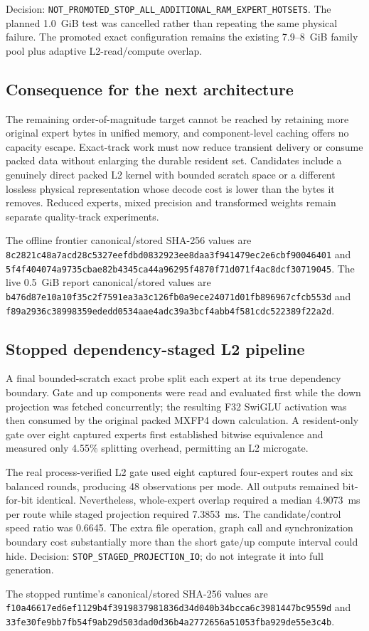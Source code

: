 Decision:
\texttt{NOT\_PROMOTED\_STOP\_ALL\_ADDITIONAL\_RAM\_EXPERT\_HOTSETS}.  The
planned 1.0~GiB test was cancelled rather than repeating the same physical
failure.  The promoted exact configuration remains the existing 7.9--8~GiB
family pool plus adaptive L2-read/compute overlap.

\subsection{Consequence for the next architecture}

The remaining order-of-magnitude target cannot be reached by retaining more
original expert bytes in unified memory, and component-level caching offers no
capacity escape.  Exact-track work must now reduce transient delivery or
consume packed data without enlarging the durable resident set.  Candidates
include a genuinely direct packed L2 kernel with bounded scratch space or a
different lossless physical representation whose decode cost is lower than the
bytes it removes.  Reduced experts, mixed precision and transformed weights
remain separate quality-track experiments.

The offline frontier canonical/stored SHA-256 values are
\texttt{8c2821c48a7acd28c5327eefdbd0832923ee8daa3f941479ec2e6cbf90046401}
and
\texttt{5f4f404074a9735cbae82b4345ca44a96295f4870f71d071f4ac8dcf30719045}.
The live 0.5~GiB report canonical/stored values are
\texttt{b476d87e10a10f35c2f7591ea3a3c126fb0a9ece24071d01fb896967cfcb553d}
and
\texttt{f89a2936c38998359ededd0534aae4adc39a3bcf4abb4f581cdc522389f22a2d}.

\subsection{Stopped dependency-staged L2 pipeline}

A final bounded-scratch exact probe split each expert at its true dependency
boundary.  Gate and up components were read and evaluated first while the down
projection was fetched concurrently; the resulting F32 SwiGLU activation was
then consumed by the original packed MXFP4 down calculation.  A resident-only
gate over eight captured experts first established bitwise equivalence and
measured only 4.55\% splitting overhead, permitting an L2 microgate.

The real process-verified L2 gate used eight captured four-expert routes and six
balanced rounds, producing 48 observations per mode.  All outputs remained
bit-for-bit identical.  Nevertheless, whole-expert overlap required a median
4.9073~ms per route while staged projection required 7.3853~ms.  The
candidate/control speed ratio was 0.6645.  The extra file operation, graph call
and synchronization boundary cost substantially more than the short gate/up
compute interval could hide.  Decision:
\texttt{STOP\_STAGED\_PROJECTION\_IO}; do not integrate it into full generation.

The stopped runtime's canonical/stored SHA-256 values are
\texttt{f10a46617ed6ef1129b4f3919837981836d34d040b34bcca6c3981447bc9559d}
and
\texttt{33fe30fe9bb7fb54f9ab29d503dad0d36b4a2772656a51053fba929de55e3c4b}.
